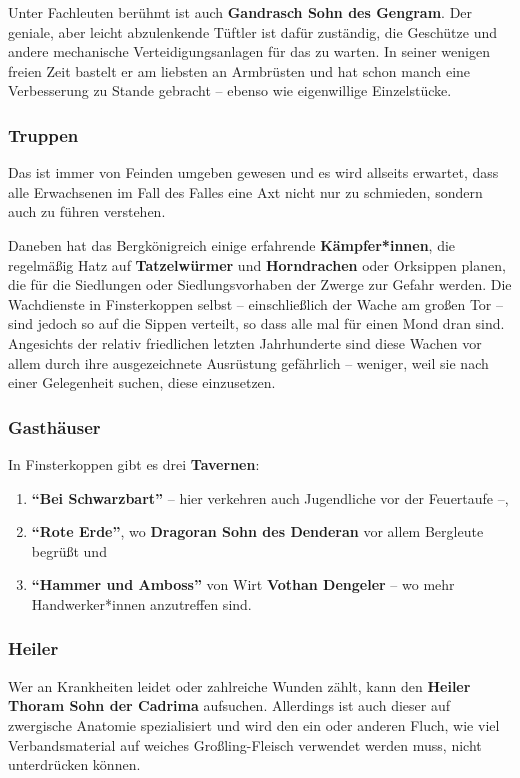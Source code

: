 Unter Fachleuten berühmt ist auch \textbf{Gandrasch Sohn des Gengram}. Der geniale, aber leicht abzulenkende Tüftler ist dafür zuständig, die Geschütze und andere mechanische Verteidigungsanlagen für das \fkv zu warten.
In seiner wenigen freien Zeit bastelt er am liebsten an Armbrüsten und hat schon manch eine Verbesserung zu Stande gebracht -- ebenso wie eigenwillige Einzelstücke.


\subsubsection{Truppen}

Das \fkv ist immer von Feinden umgeben gewesen und es wird allseits erwartet, dass alle Erwachsenen im Fall des Falles eine Axt nicht nur zu schmieden, sondern auch zu führen verstehen.

Daneben hat das Bergkönigreich einige erfahrende \textbf{Kämpfer*innen}, die regelmäßig Hatz auf \textbf{Tatzelwürmer} und \textbf{Horndrachen} oder Orksippen planen,
die für die Siedlungen oder Siedlungsvorhaben der Zwerge zur Gefahr werden.
Die Wachdienste in Finsterkoppen selbst -- einschließlich der Wache am großen Tor -- sind jedoch so auf die Sippen verteilt,
so dass alle mal für einen Mond dran sind.
Angesichts der relativ friedlichen letzten Jahrhunderte sind diese Wachen vor allem durch ihre ausgezeichnete Ausrüstung gefährlich -- weniger, weil sie nach einer Gelegenheit suchen, diese einzusetzen.

\subsubsection{Gasthäuser}
In Finsterkoppen gibt es drei \textbf{Tavernen}: 
\begin{enumerate}
	\item \textbf{\enquote{Bei Schwarzbart}} -- hier verkehren auch Jugendliche vor der Feuertaufe --,
	\item \textbf{\enquote{Rote Erde}}, wo \textbf{Dragoran Sohn des Denderan} vor allem Bergleute begrüßt und \item \textbf{\enquote{Hammer und Amboss}} von Wirt \textbf{Vothan Dengeler} -- wo mehr Handwerker*innen anzutreffen sind.
\end{enumerate}

\subsubsection{Heiler}
Wer an Krankheiten leidet oder zahlreiche Wunden zählt, kann den \textbf{Heiler Thoram Sohn der Cadrima} aufsuchen.
Allerdings ist auch dieser auf zwergische Anatomie spezialisiert und wird den ein oder anderen Fluch, wie viel Verbandsmaterial auf weiches Großling-Fleisch verwendet werden muss, nicht unterdrücken können.

